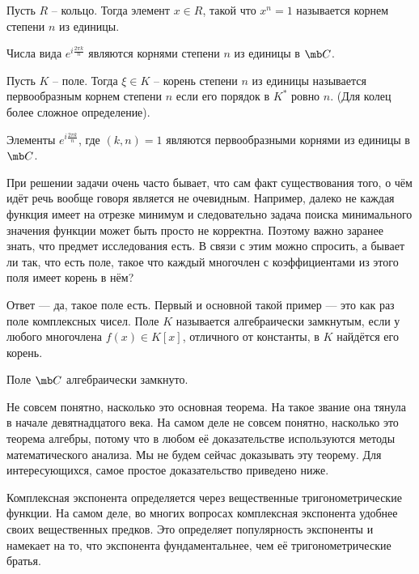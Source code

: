 \dfn Пусть $R$ -- кольцо. Тогда элемент $x\in R$, такой что $x^n=1$ называется корнем степени $n$ из единицы.
\edfn

\rm Числа вида $e^{i\frac{2\pi k}{n}}$ являются корнями степени $n$ из единицы в $\mb C$.
\erm

\dfn Пусть $K$ -- поле. Тогда $\xi\in K$ -- корень степени $n$ из единицы  называется первообразным корнем степени $n$ если его порядок в $ K^*$ ровно $n$. (Для колец более сложное определение).
\edfn

\rm Элементы $e^{i\frac{2\pi k}{n}}$, где $(k,n)=1$ являются первообразными корнями из единицы в $\mb C$.
\erm


При решении задачи очень часто бывает, что сам факт существования того, о чём идёт речь вообще говоря является не очевидным. Например, далеко не каждая функция имеет на отрезке минимум и следовательно задача поиска минимального значения функции может быть просто не корректна. Поэтому важно заранее знать, что предмет исследования есть.  В связи с этим можно спросить, а бывает ли так, что есть поле, такое что каждый многочлен с коэффициентами из этого поля имеет корень в нём?

Ответ — да, такое поле есть. Первый и основной такой пример --- это как раз поле комплексных чисел.
 Поле $K$ называется алгебраически замкнутым, если у любого многочлена  $f(x)\in K[x]$, отличного от константы, в $K$ найдётся его корень.
\edfn

 Поле $\mb C$ алгебраически замкнуто.
\ethrm

Не совсем понятно, насколько это основная теорема. На такое звание она тянула в начале девятнадцатого века. На самом деле не совсем понятно, насколько это теорема алгебры, потому что в любом её доказательстве используются методы математического анализа. Мы не будем сейчас доказывать эту теорему. Для интересующихся, самое простое доказательство приведено ниже. 





Комплексная экспонента определяется через вещественные тригонометрические функции. На самом деле, во многих вопросах комплексная экспонента удобнее своих вещественных предков. Это определяет популярность экспоненты и намекает на то, что экспонента фундаментальнее, чем её тригонометрические братья.


